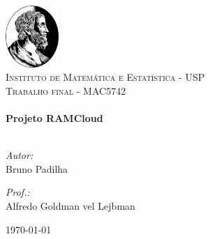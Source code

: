 \begin{titlepage}
\begin{center}

\includegraphics[width=0.15\textwidth]{figuras/grego.jpg}\\[1cm]    
\textsc{\LARGE Instituto de Matemática e Estatística - USP}\\[0.5cm]
\textsc{\large Trabalho final - MAC5742}\\[3cm]
\HRule \\[0.7cm]
{ \huge \bfseries Projeto RAMCloud}\\[0.4cm]

\HRule \\[3.5cm]


\begin{minipage}{0.4\textwidth}
\begin{flushleft} \large
\emph{Autor:}\\
Bruno Padilha\\
\end{flushleft}
\end{minipage}
\begin{minipage}{0.4\textwidth}
\begin{flushright} \large
\emph{Prof.:} \\
Alfredo Goldman vel Lejbman\\
\end{flushright}
\end{minipage}

\vfill

{\large \today}

\end{center}

\end{titlepage}
